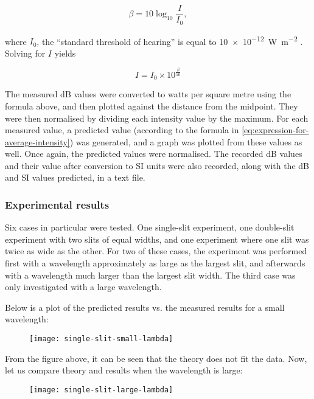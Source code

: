 \documentclass{paper}
\begin{document}
\begin{equation*}
    \beta = 10\log_{10}\frac{I}{I_0},
\end{equation*}
                
where $I_0$, the \enquote{standard threshold of hearing} is equal to \SI{10e-12}{\watt\per\square\m} \parencite{decibel-to-intensity}.
Solving for $I$ yields

\begin{equation*}
    I = I_{0} \times 10^{\frac{\beta}{10}}
\end{equation*}

The measured dB values were converted to watts per square metre using the formula above,
and then plotted against the distance from the midpoint. They were then normalised by dividing each
intensity value by the maximum. For each measured value, a predicted value (according to the formula in 
\eqref{eq:expression-for-average-intensity}) was generated, and a graph was plotted from these values as well.
Once again, the predicted values were normalised. The recorded dB values and their value after conversion to
SI units were also recorded, along with the dB and SI values predicted, in a text file.

\subsubsection{Experimental results}

Six cases in particular were tested. One single-slit experiment, one double-slit
experiment with two slits of equal widths, and one experiment where one slit was twice
as wide as the other. For two of these cases, the experiment was performed first with
a wavelength approximately as large as the largest slit, and afterwards with a wavelength much
larger than the largest slit width. The third case was only investigated with a large wavelength.

Below is a plot of the predicted results vs. the measured results for a small wavelength:

\begin{figure}[H]
\label{fig:single-slit-small-lambda}
    \texttt{[image: single-slit-small-lambda]}

\end{figure}
From the figure above, it can be seen that the theory does not fit the data.
Now, let us compare theory and results when the wavelength is large:

\begin{figure}[H]
\label{fig:single-slit-large-lambda}
    \texttt{[image: single-slit-large-lambda]}
\end{figure} 
\end{document}
